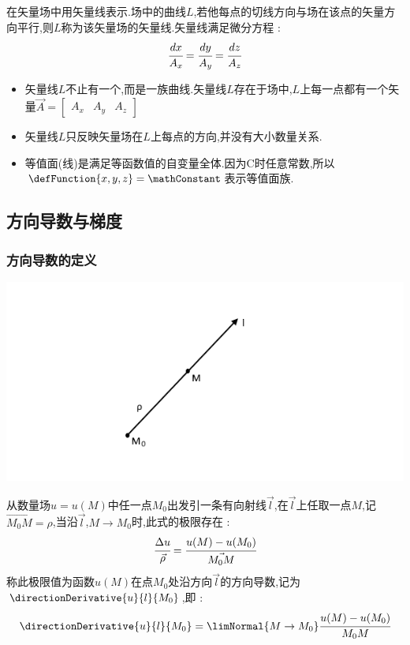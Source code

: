 {{{{      在矢量场中用矢量线表示.场中的曲线$L$,若他每点的切线方向与场在该点的矢量方向平行,则$L$称为该矢量场的矢量线.矢量线满足微分方程 :
      $$
        \cfrac{dx}{A_x} = \cfrac{dy}{A_y} = \cfrac{dz}{A_z}
      $$

      \begin{itemize}
        \item 矢量线$L$不止有一个,而是一族曲线.矢量线$L$存在于场中,$L$上每一点都有一个矢量$\vec{A} = \begin{bmatrix}
                  A_x & A_y & A_z
                \end{bmatrix}$
        \item 矢量线$L$只反映矢量场在$L$上每点的方向,并没有大小数量关系.
        \item 等值面(线)是满足等函数值的自变量全体.因为C时任意常数,所以$\defFunction{x,y,z} = \mathConstant$表示等值面族.
      \end{itemize}
    }%

  }%

  \subsection{方向导数与梯度}{

    \subsubsection{方向导数的定义}{
      \includegraphics{resources/directionDerivative1.png}

      从数量场$u= u(M)$中任一点$M_0$出发引一条有向射线$\vec{l}$,在$\vec{l}$上任取一点$M$,记$\vec{M_0M} = \rho$,当沿$\vec{l}$,$M \to M_0$时,此式的极限存在 :
      $$
        \cfrac{\Delta u}{\vec{\rho}} = \cfrac{u(M) - u(M_0)}{\vec{M_0M}}
      $$
      称此极限值为函数$u(M)$在点$M_0$处沿方向$\vec{l}$的方向导数,记为$\directionDerivative{u}{l}{M_0}$,即 :
      $$
        \directionDerivative{u}{l}{M_0} = \limNormal{M \to M_0}\cfrac{u(M) - u(M_0)}{M_0M}
      $$

}}}}
